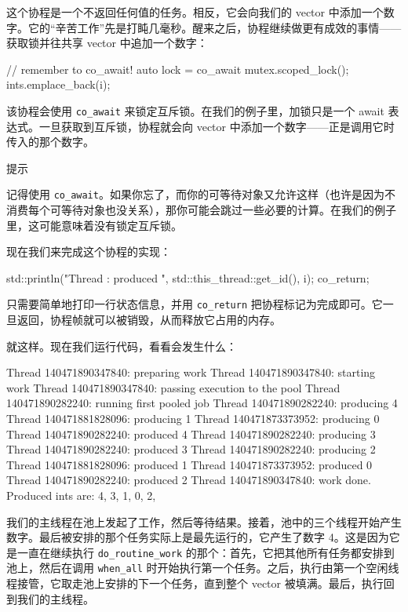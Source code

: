 这个协程是一个不返回任何值的任务。相反，它会向我们的 vector 中添加一个数字。它的“辛苦工作”先是打盹几毫秒。醒来之后，协程继续做更有成效的事情——获取锁并往共享 vector 中追加一个数字：

\begin{codebox}[text]
  {
    // remember to co_await!
    auto lock = co_await mutex.scoped_lock();
    ints.emplace_back(i);
  }
\end{codebox}

该协程会使用 \texttt{co\_await} 来锁定互斥锁。在我们的例子里，加锁只是一个 await 表达式。一旦获取到互斥锁，协程就会向 vector 中添加一个数字——正是调用它时传入的那个数字。

\begin{myTip}{提示}

记得使用 \texttt{co\_await}。如果你忘了，而你的可等待对象又允许这样（也许是因为不消费每个可等待对象也没关系），那你可能会跳过一些必要的计算。在我们的例子里，这可能意味着没有锁定互斥锁。
\end{myTip}

现在我们来完成这个协程的实现：

\begin{codebox}[cpp]
  std::println("Thread {}: produced {}",  std::this_thread::get_id(), i);
  co_return;
\end{codebox}

\label{idx:1278}
只需要简单地打印一行状态信息，并用 \texttt{co\_\allowbreak{}return} 把协程标记为完成即可。它一旦返回，协程帧就可以被销毁，从而释放它占用的内存。

就这样。现在我们运行代码，看看会发生什么：

\begin{codebox}[text]
Thread 140471890347840: preparing work
Thread 140471890347840: starting work
Thread 140471890347840: passing execution to the pool
Thread 140471890282240: running first pooled job
Thread 140471890282240: producing 4
Thread 140471881828096: producing 1
Thread 140471873373952: producing 0
Thread 140471890282240: produced 4
Thread 140471890282240: producing 3
Thread 140471890282240: produced 3
Thread 140471890282240: producing 2
Thread 140471881828096: produced 1
Thread 140471873373952: produced 0
Thread 140471890282240: produced 2
Thread 140471890347840: work done.
Produced ints are: 4, 3, 1, 0, 2,
\end{codebox}

\label{idx:1279}
我们的主线程在池上发起了工作，然后等待结果。接着，池中的三个线程开始产生数字。最后被安排的那个任务实际上是最先运行的，它产生了数字 4。这是因为它是一直在继续执行 \texttt{do\_\allowbreak{}routine\_\allowbreak{}work} 的那个：首先，它把其他所有任务都安排到池上，然后在调用 \texttt{when\_all} 时开始执行第一个任务。之后，执行由第一个空闲线程接管，它取走池上安排的下一个任务，直到整个 vector 被填满。最后，执行回到我们的主线程。

